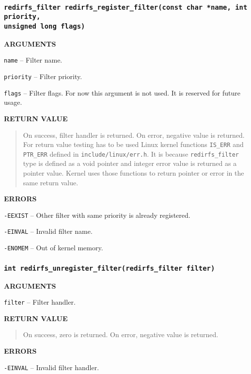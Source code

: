 \subsubsection{\texttt{redirfs\_filter  redirfs\_register\_filter(const char *name,
int priority,\\unsigned long flags)}} 
\begin{list}{}{}
	\item \textbf{ARGUMENTS}
		\begin{list}{}{}
			\item \texttt{name} -- Filter name.
			\item \texttt{priority} -- Filter priority.
			\item \texttt{flags} -- Filter flags. For now this argument
				is not used. It is reserved for future usage.
		\end{list}
	\item \textbf{RETURN VALUE}
		\begin{quotation}
			\noindent On success, filter handler is returned. On error,
			negative value is returned. For return value testing has to be
			used Linux kernel functions \texttt{IS\_ERR} and
			\texttt{PTR\_ERR} defined in \texttt{include/linux/err.h}. It
			is because \texttt{redirfs\_filter} type is defined as a void
			pointer and integer error value is returned as a pointer
			value. Kernel uses those functions to return pointer or error
			in the same return value.
		\end{quotation}
	\item \textbf{ERRORS}
		\begin{list}{}{}
			\item \texttt{-EEXIST} -- Other filter with same priority is
				already registered.
			\item \texttt{-EINVAL} -- Invalid filter name.
			\item \texttt{-ENOMEM} -- Out of kernel memory.
		\end{list}
\end{list}

\subsubsection{\texttt{int redirfs\_unregister\_filter(redirfs\_filter filter)}} 
\begin{list}{}{}
	\item \textbf{ARGUMENTS}
		\begin{list}{}{}
			\item \texttt{filter} -- Filter handler.
		\end{list}
	\item \textbf{RETURN VALUE}
		\begin{quotation}
			\noindent On success, zero is returned. On error, negative
			value is returned.
		\end{quotation}
	\item \textbf{ERRORS}
		\begin{list}{}{}
			\item \texttt{-EINVAL} -- Invalid filter handler.
		\end{list}
\end{list}

